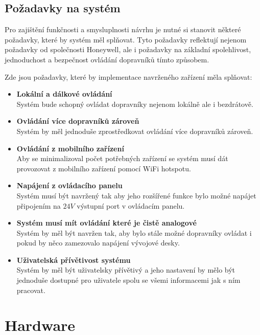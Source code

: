 \subsection{Požadavky na systém}\label{sec:PozadavkyNaSystem}
Pro zajištění funkčnosti a smysluplnosti návrhu je nutné si stanovit některé požadavky, které by systém měl splňovat. Tyto požadavky reflektují nejenom požadavky od společnosti Honeywell, ale i požadavky na základní spolehlivost, jednoduchost a bezpečnost ovládání dopravníků tímto způsobem.

Zde jsou požadavky, které by implementace navrženého zařízení měla splňovat:

\begin{itemize}
    \item \textbf{Lokální a dálkové ovládání}\\
    Systém bude schopný ovládat dopravníky nejenom lokálně ale i bezdrátově.
    \item \textbf{Ovládání více dopravníků zároveň}\\
    Systém by měl jednoduše zprostředkovat ovládání více dopravníků zároveň.
    \item \textbf{Ovládání z mobilního zařízení}\\
    Aby se minimalizoval počet potřebných zařízení se systém musí dát provozovat z mobilního zařízení pomocí WiFi hotspotu.
    \item \textbf{Napájení z ovládacího panelu}\\
    Systém musí být navržený tak aby jeho rozšířené funkce bylo možné napájet připojením na $24V$ výstupní port v ovládacím panelu.
    \item \textbf{Systém musí mít ovládání které je čistě analogové}\\
    Systém by měl být navržen tak, aby bylo stále možné dopravníky ovládat i pokud by něco zamezovalo napájení vývojové desky.
    \item \textbf{Uživatelská přívětivost systému}\\
    Systém by měl být uživatelsky přívětivý a jeho nastavení by mělo být jednoduše dostupné pro uživatele spolu se všemi informacemi jak s ním pracovat.
\end{itemize}

\section{Hardware}\label{sec:Hardware}

